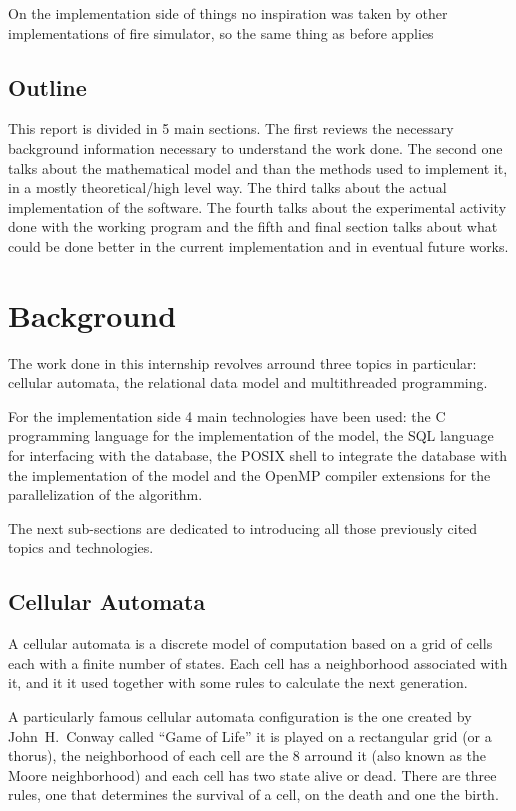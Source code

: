 \documentclass[Lau]{sapthesis} %
\begin{document}
On the implementation side of things no inspiration was taken by other
implementations of fire simulator, so the same thing as before applies

\subsection{Outline}

This report is divided in 5 main sections. The first reviews the necessary
background information necessary to understand the work done. The second one
talks about the mathematical model and than the methods used to implement it, in
a mostly theoretical/high level way. The third talks about the actual
implementation of the software. The fourth talks about the experimental activity
done with the working program and the fifth and final section talks about what
could be done better in the current implementation and in eventual future works.

\section{Background}%

The work done in this internship revolves arround three topics in particular:
cellular automata, the relational data model \cite{codd} and multithreaded
programming.

For the implementation side 4 main technologies have been used: the C
programming language for the implementation of the model, the SQL language for
interfacing with the database, the POSIX shell to integrate the database with
the implementation of the model and the OpenMP compiler extensions for the
parallelization of the algorithm.

The next sub-sections are dedicated to introducing all those previously cited
topics and technologies.

\subsection{Cellular Automata}

A cellular automata is a discrete model of computation based on a grid of cells
each with a finite number of states. Each cell has a neighborhood associated
with it, and it it used together with some rules to calculate the next
generation.

A particularly famous cellular automata configuration is the one created by
John~H.~Conway called ``Game of Life'' \cite{gol} it is played on a rectangular
grid (or a thorus), the neighborhood of each cell are the 8 arround it (also
known as the Moore neighborhood) and each cell has two state alive or dead.
There are three rules, one that determines the survival of a cell, on the death
and one the birth.
\end{document}
